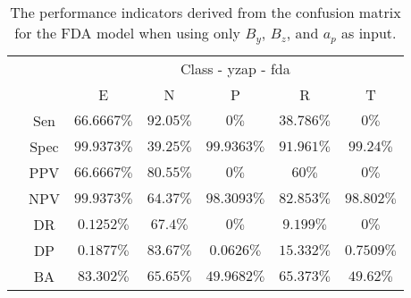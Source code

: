 \begin{table}[!ht]
	\centering
	\begin{tabular}{|c|c|c|c|c|c|c|}
		\cline{3-7}
		\multicolumn{2}{c|}{} & \multicolumn{5}{c|}{Class - yzap - fda} \\ \cline{3-7}
		\multicolumn{2}{c|}{} & E & N & P & R & T \\ \hline
		\multirow{7}{*}{\rotatebox{90}{Statistics}} & Sen & $66.6667\%$ & $92.05\%$ & $0\%$ & $38.786\%$ & $0\%$ \\ \cline{2-7}
		 & Spec & $99.9373\%$ & $39.25\%$ & $99.9363\%$ & $91.961\%$ & $99.24\%$ \\ \cline{2-7}
		 & PPV & $66.6667\%$ & $80.55\%$ & $0\%$ & $60\%$ & $0\%$ \\ \cline{2-7}
		 & NPV & $99.9373\%$ & $64.37\%$ & $98.3093\%$ & $82.853\%$ & $98.802\%$ \\ \cline{2-7}
		 & DR & $0.1252\%$ & $67.4\%$ & $0\%$ & $9.199\%$ & $0\%$ \\ \cline{2-7}
		 & DP & $0.1877\%$ & $83.67\%$ & $0.0626\%$ & $15.332\%$ & $0.7509\%$ \\ \cline{2-7}
		 & BA & $83.302\%$ & $65.65\%$ & $49.9682\%$ & $65.373\%$ & $49.62\%$ \\ \hline
	\end{tabular}
	\caption{The performance indicators derived from the confusion matrix for the FDA model when using only $B_{y}$, $B_{z}$, and $a_{p}$ as input.}
	\label{tab:cs:reverse:yzap:fda}
\end{table}

